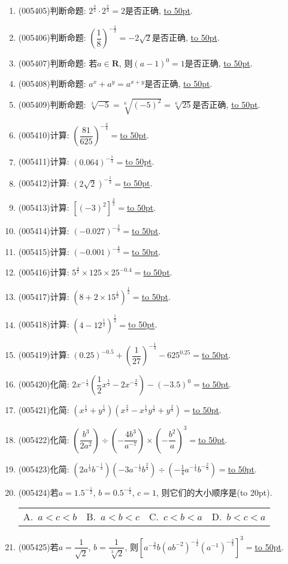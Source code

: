\documentclass[10pt,a4paper]{article}
\newcommand{\blank}[1]{\underline{\hbox to #1pt{}}}
\newcommand{\bracket}[1]{(\hbox to #1pt{})}
\newcommand{\fourch}[4]{\par\begin{tabular}{p{.23\textwidth}p{.23\textwidth}p{.23\textwidth}p{.23\textwidth}}
A.~#1 &B.~#2& C.~#3& D.~#4
\end{tabular}}
\begin{document}
\begin{enumerate}[1.]
\item {\tiny (005405)}判断命题: $2^{\frac 32}\cdot 2^{\frac 23}=2$是否正确, \blank{50}.
\item {\tiny (005406)}判断命题: $(\dfrac 18)^{-\frac 12}=-2\sqrt 2$是否正确, \blank{50}.
\item {\tiny (005407)}判断命题: 若$a\in \mathbf{R}$, 则$(a-1)^0=1$是否正确, \blank{50}.
\item {\tiny (005408)}判断命题: $a^x+a^y=a^{x+y}$是否正确, \blank{50}.
\item {\tiny (005409)}判断命题: $\sqrt [3]{-5}=\sqrt [6]{(-5)^2}=\sqrt [6]{25}$是否正确, \blank{50}.
\item {\tiny (005410)}计算: $(\dfrac{81}{625})^{-\frac 34}=$\blank{50}.
\item {\tiny (005411)}计算: $(0.064)^{-\frac 13}=$\blank{50}.
\item {\tiny (005412)}计算: $(2\sqrt 2)^{-\frac 13}=$\blank{50}.
\item {\tiny (005413)}计算: $[ (-3)^2 ]^{\frac 32}=$\blank{50}.
\item {\tiny (005414)}计算: $(-0.027)^{-\frac 23}=$\blank{50}.
\item {\tiny (005415)}计算: $(-0.001)^{-\frac 43}=$\blank{50}.
\item {\tiny (005416)}计算: $5^{\frac 45}\times 125	\times 25^{-0.4}=$\blank{50}.
\item {\tiny (005417)}计算: $(8+2	\times 15^{\frac 12})^{\frac 12}=$\blank{50}.
\item {\tiny (005418)}计算: $(4-12^{\frac 12})^{\frac 12}=$\blank{50}.
\item {\tiny (005419)}计算: $(0.25)^{-0.5}+(\dfrac 1{27})^{-\frac 13}-625^{0.25}=$\blank{50}.
\item {\tiny (005420)}化简: $2x^{-\frac 13}(\dfrac 12x^{\frac 13}-2x^{-\frac 23})-(-3.5)^0=$\blank{50}.
\item {\tiny (005421)}化简: $(x^{\frac 13}+y^{\frac 13})(x^{\frac 23}-x^{\frac 13}y^{\frac 13}+y^{\frac 23})=$\blank{50}.
\item {\tiny (005422)}化简: $(\dfrac{b^3}{2a^2})\div (-\dfrac{4b^3}{a^{-7}})\times (-\dfrac{b^2}a)^3=$\blank{50}.
\item {\tiny (005423)}化简: $(2a^{\frac 14}b^{-\frac 13})(-3a^{-\frac 12}b^{\frac 23})\div (-\frac 14a^{-\frac 14}b^{-\frac 23})=$\blank{50}.
\item {\tiny (005424)}若$a=1.5^{-\frac 12}$, $b=0.5^{-\frac 12}$, $c=1$, 则它们的大小顺序是\bracket{20}.
\fourch{$a<c<b$}{$a<b<c$}{$c<b<a$}{$b<c<a$}
\item {\tiny (005425)}若$a=\dfrac 1{\sqrt 2}$, $b=\dfrac 1{\sqrt[3]2}$, 则$[a^{-\frac 32}b(ab^{-2})^{-\frac 12}(a^{-1})^{-\frac 23}]^3=$\blank{50}.

\end{enumerate}
\end{document}

